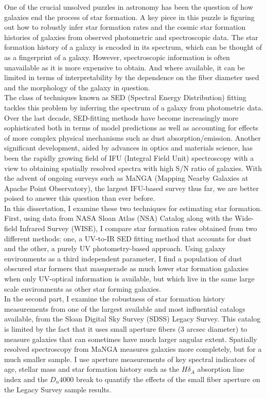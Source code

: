 
\doublespacing
One of the crucial unsolved puzzles in astronomy has been the question of how galaxies end the process of star formation. A key piece in this puzzle is figuring out how to robustly infer star formation rates and the cosmic star formation histories of galaxies from observed photometric and spectroscopic data. The star formation history of a galaxy is encoded in its spectrum, which can be thought of as a fingerprint of a galaxy. However, spectroscopic information is often unavailable as it is more expensive to obtain. And where available, it can be limited in terms of interpretability by the dependence on the fiber diameter used and the morphology of the galaxy in question.\\

The class of techniques known as SED (Spectral Energy Distribution) fitting tackles this problem by inferring the spectrum of a galaxy from photometric data. Over the last decade, SED-fitting methods have become increasingly more sophisticated both in terms of model predictions as well as accounting for effects of more complex physical mechanisms such as dust absorption/emission. Another significant development, aided by advances in optics and materials science, has been the rapidly growing field of IFU (Integral Field Unit) spectroscopy with a view to obtaining spatially resolved spectra with high S/N ratio of galaxies. With the advent of ongoing surveys such as MaNGA (Mapping Nearby Galaxies at Apache Point Observatory), the largest IFU-based survey thus far, we are better poised to answer this question than ever before.\\

In this dissertation, I examine these two techniques for estimating star formation. First, using data from NASA Sloan Atlas (NSA) Catalog along with the Wide-field Infrared Survey (WISE), I compare star formation rates obtained from two different methods: one, a UV-to-IR SED fitting method that accounts for dust and the other, a  purely UV photometry-based approach. Using galaxy environments as a third independent parameter, I find a population of dust obscured star formers that masquerade as much lower star formation galaxies when only UV-optical information is available, but which live in the same large scale environments as other star forming galaxies.\\

In the second part, I examine the robustness of star formation history measurements from one of the largest available and most influential catalogs available, from the Sloan Digital Sky Survey (SDSS) Legacy Survey. This catalog is limited by the fact that it uses small aperture fibers ($3$ arcsec diameter) to measure galaxies that can sometimes have much larger angular extent. Spatially resolved spectroscopy from MaNGA measures galaxies more completely, but for a much smaller sample. I use aperture measurements of key spectral indicators of age, stellar mass and star formation history such as the $H \delta_{A}$ absorption line index and the $D_{n}4000$ break to quantify the effects of the small fiber aperture on the Legacy Survey sample results.\\